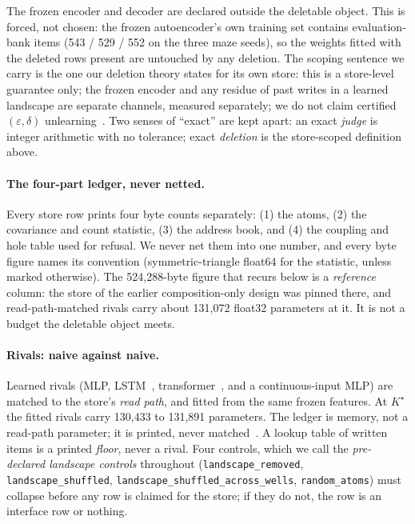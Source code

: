 \documentclass{article} %
\newcommand{\Kstar}{\ensuremath{K^{\star}}}
\begin{document}
\noindent The frozen encoder and decoder are declared outside the deletable object. This is
forced, not chosen: the frozen autoencoder's own training set contains evaluation-bank items
(543 / 529 / 552 on the three maze seeds), so the weights fitted with the deleted rows present
are untouched by any deletion. %
The scoping sentence we carry is the one our deletion theory states for its own store: this is
a store-level guarantee only; the frozen encoder and any residue of past writes in a learned
landscape are separate channels, measured separately; we do not claim certified
$(\varepsilon,\delta)$ unlearning~\citep{guo2020certified}. %
Two senses of ``exact'' are kept apart: an exact \emph{judge} is integer arithmetic with no
tolerance; exact \emph{deletion} is the store-scoped definition above.

\paragraph{The four-part ledger, never netted.} Every store row prints four byte counts
separately: (1) the atoms, (2) the covariance and count statistic, (3) the address book, and
(4) the coupling and hole table used for refusal. We never net them into one number, and every
byte figure names its convention (symmetric-triangle float64 for the statistic, unless marked
otherwise). The 524,288-byte figure that recurs below is a \emph{reference} column: the store
of the earlier composition-only design was pinned there, and read-path-matched rivals carry
about 131,072 float32 parameters at it. %
It is not a budget the deletable object meets.

\paragraph{Rivals: naive against naive.} Learned rivals (MLP, LSTM~\citep{hochreiter1997long}, transformer~\citep{vaswani2017attention}, and a
continuous-input MLP) are matched to the store's \emph{read path}, and fitted from the same
frozen features. At $\Kstar$ the fitted rivals carry 130,433 to 131,891 parameters.
The ledger is memory, not a read-path parameter; it is printed, never matched~\citep{borgeaud2021improving,khandelwal2020generalization,lample2019large}. A lookup table
of written items is a printed \emph{floor}, never a rival. Four controls, which we call the
\emph{pre-declared landscape controls} throughout (\texttt{landscape\_removed}, \texttt{landscape\_shuffled},
\texttt{landscape\_shuffled\_across\_wells}, \texttt{random\_atoms}) must collapse before any
row is claimed for the store; if they do not, the row is an interface row or nothing.
\end{document}
